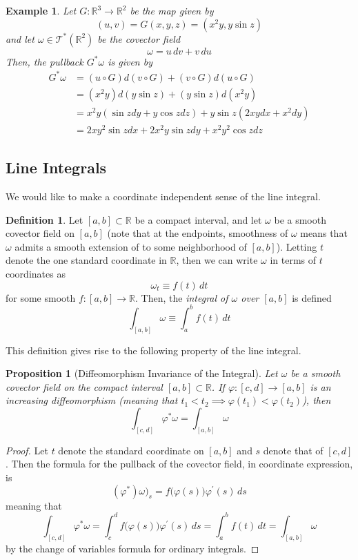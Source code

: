\documentclass{article}
\newtheorem{proposition}[theorem]{Proposition}
\newtheorem{example}{Example}[section]
\theoremstyle{remark}
\theoremstyle{definition}
\newtheorem{definition}{Definition}[section]
\begin{document}
    \begin{example}
    Let $G: \mathbb{R}^3 \longrightarrow \mathbb{R}^2$ be the map given by 
    \[(u, v) = G(x, y, z) = (x^2 y, y \sin{z})\]
    and let $\omega \in \mathcal{T}^*(\mathbb{R}^2)$ be the covector field 
    \[\omega = u \,dv + v\,du\]
    Then, the pullback $G^* \omega$ is given by 
    \begin{align*}
        G^* \omega & = (u \circ G) d(v \circ G) + (v \circ G) d (u \circ G) \\
        & = (x^2 y) d(y \sin{z}) + (y \sin{z}) d (x^2 y) \\
        & = x^2 y (\sin{z} dy + y \cos{z} dz) + y \sin{z} (2xy dx + x^2 dy) \\
        & = 2xy^2 \sin{z} dx + 2x^2 y \sin{z} dy + x^2 y^2 \cos{z} dz
    \end{align*}
    \end{example}

  \subsection{Line Integrals}

    We would like to make a coordinate independent sense of the line integral. 

    \begin{definition}
    Let $[a, b] \subset \mathbb{R}$ be a compact interval, and let $\omega$ be a smooth covector field on $[a,b]$ (note that at the endpoints, smoothness of $\omega$ means that $\omega$ admits a smooth extension of to some neighborhood of $[a,b]$). Letting $t$ denote the one standard coordinate in $\mathbb{R}$, then we can write $\omega$ in terms of $t$ coordinates as 
    \[\omega_t \equiv f(t)\,dt\]
    for some smooth $f: [a,b] \longrightarrow \mathbb{R}$. Then, the \textit{integral of $\omega$ over $[a,b]$} is defined 
    \[\int_{[a,b]} \omega \equiv \int_a^b f(t)\,dt\]
    \end{definition}

    This definition gives rise to the following property of the line integral. 

    \begin{proposition}[Diffeomorphism Invariance of the Integral]
    Let $\omega$ be a smooth covector field on the compact interval $[a,b] \subset \mathbb{R}$. If $\varphi: [c,d] \longrightarrow [a,b]$ is an increasing diffeomorphism (meaning that $t_1 < t_2 \implies \varphi(t_1) < \varphi(t_2)$), then
    \[\int_{[c,d]} \varphi^* \omega = \int_{[a,b]} \omega\]
    \end{proposition}
    \begin{proof}
    Let $t$ denote the standard coordinate on $[a,b]$ and $s$ denote that of $[c,d]$. Then the formula for the pullback of the covector field, in coordinate expression, is
    \[(\varphi^*) \omega)_s = f\big(\varphi(s)\big) \varphi^\prime (s)\,ds\]
    meaning that 
    \[\int_{[c,d]} \varphi^* \omega = \int_c^d f\big( \varphi(s) \big) \varphi^\prime (s) \,ds = \int_a^b f(t)\,dt = \int_{[a,b]} \omega\]
    by the change of variables formula for ordinary integrals. 
    \end{proof}
\end{document}
